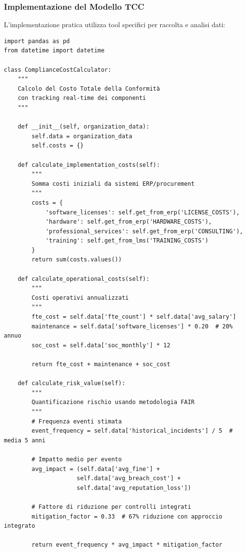 \subsubsection{Implementazione del Modello TCC}

L'implementazione pratica utilizza tool specifici per raccolta e analisi dati:

\begin{lstlisting}[caption={Dashboard Python per Calcolo TCC},label={lst:tcc_dashboard}]
import pandas as pd
from datetime import datetime

class ComplianceCostCalculator:
    """
    Calcolo del Costo Totale della Conformità 
    con tracking real-time dei componenti
    """
    
    def __init__(self, organization_data):
        self.data = organization_data
        self.costs = {}
        
    def calculate_implementation_costs(self):
        """
        Somma costi iniziali da sistemi ERP/procurement
        """
        costs = {
            'software_licenses': self.get_from_erp('LICENSE_COSTS'),
            'hardware': self.get_from_erp('HARDWARE_COSTS'),
            'professional_services': self.get_from_erp('CONSULTING'),
            'training': self.get_from_lms('TRAINING_COSTS')
        }
        return sum(costs.values())
    
    def calculate_operational_costs(self):
        """
        Costi operativi annualizzati
        """
        fte_cost = self.data['fte_count'] * self.data['avg_salary']
        maintenance = self.data['software_licenses'] * 0.20  # 20% annuo
        soc_cost = self.data['soc_monthly'] * 12
        
        return fte_cost + maintenance + soc_cost
    
    def calculate_risk_value(self):
        """
        Quantificazione rischio usando metodologia FAIR
        """
        # Frequenza eventi stimata
        event_frequency = self.data['historical_incidents'] / 5  # media 5 anni
        
        # Impatto medio per evento
        avg_impact = (self.data['avg_fine'] + 
                     self.data['avg_breach_cost'] + 
                     self.data['avg_reputation_loss'])
        
        # Fattore di riduzione per controlli integrati
        mitigation_factor = 0.33  # 67% riduzione con approccio integrato
        
        return event_frequency * avg_impact * mitigation_factor
    

\end{lstlisting}
